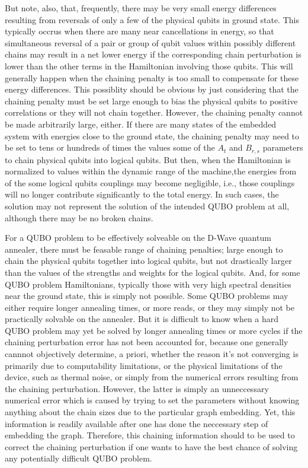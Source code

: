 \documentclass[preprint,12pt,eqsecnum,nofootinbib,amsmath,amssymb]{revtex4}
\begin{document}
But note, also, that, frequently, there may be very small energy differences resulting from reversals of only
a few of the physical qubits in ground state. This typically occrus when there are many near cancellations
in energy, so that simultaneous reversal of a pair or group of qubit values within possibly different chains
may result in a net lower energy if the corresponding chain perturbation is lower than
the other terms in the Hamiltonian involving those qubits. This will generally happen when the 
chaining penalty is too small to compensate for these energy differences. This possiblity should be
obvious by just considering that the chaining penalty must be set large enough to bias the physical
qubits to positive correlations or they will not chain together. However, the chaining penalty 
cannot be made arbitrarily large, either.  If there are many states of the embedded system with 
energies close to the ground state, the chaining penalty may need to be set to tens or hundreds 
of times the values some of the $A_t$ and $B_{r,s}$ parameters to chain physical qubits into
logical qubits. But then, when the Hamiltonian is normalized to values within the dynamic range 
of the machine,the energies from of the some logical qubits couplings may become negligible, 
i.e., those couplings will no longer contribute significantly to the total energy. In such cases,
the solution may not represent the solution of the intended QUBO problem at all, although there
may be no broken chains. 

For a QUBO problem to be effectively solveable on the D-Wave quantum annealer, there must be feasable range of 
chaining penalties; large enough to chain the physical qubits together into logical qubits, but not drastically 
larger than the values of the strengths and weights for the logical qubits. And, for some QUBO problem Hamiltonians, 
typically those with very high spectral densities near the ground state, this is simply not possible. Some QUBO problems 
may either require longer annealing times, or more reads, or they may simply not be practically solvable on the annealer.
But it is difficult to know when a hard QUBO problem may yet be solved by longer annealing times or more cycles
if the chaining perturbation error has not been accounted for, because one generally cannnot objectively determine, a priori,
whether the reason it's not converging is primarily due to computability limitations, or the physical limitations of the device, 
such as thermal noise, or simply from the numerical errors resulting from the chaining perturbation. However, the latter 
is simply an unneccessary numerical error which is caused by trying to set the parameters without knowing anything 
about the chain sizes due to the particular graph embedding. Yet, this information is readily available after one has done 
the neccessary step of embedding the graph. Therefore, this chaining information should to be used to correct the 
chaining perturbation if one wants to have the best chance of solving any potentially difficult QUBO problem.
\end{document}
